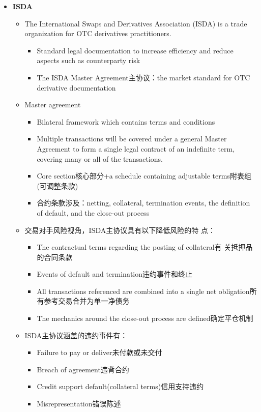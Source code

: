\begin{itemize}
\item \textbf{ISDA}
\begin{itemize}
    \item The International Swaps and Derivatives Association (ISDA) is a trade organization for OTC derivatives practitioners.
    \begin{itemize}
        \item Standard legal documentation to increase efficiency and reduce aspects such as counterparty risk
        \item The ISDA Master Agreement主协议：the market standard for OTC derivative documentation
    \end{itemize}
    \item Master agreement
    \begin{itemize}
    \item Bilateral framework which contains terms and conditions
    \item Multiple transactions will be covered under a general Master Agreement to form a single legal contract of an indefinite term, covering many or all of the transactions.
    \item Core section核心部分+a schedule containing adjustable terms附表组(可调整条款)
    \item 合约条款涉及：netting, collateral, termination events, the definition of default, and the close-out process
    \end{itemize}
\item 交易对手风险视角，ISDA主协议具有以下降低风险的特
点：
\begin{itemize}
\item The contractual terms regarding the posting of collateral有
关抵押品的合同条款
\item Events of default and termination违约事件和终止
\item All transactions referenced are combined into a single net obligation所有参考交易合并为单一净债务
\item The mechanics around the close-out process are defined确定平仓机制
\end{itemize}
\item ISDA主协议涵盖的违约事件有：
\begin{itemize}
\item Failure to pay or deliver未付款或未交付
\item Breach of agreement违背合约
\item Credit support default(collateral terms)信用支持违约
\item Misrepresentation错误陈述

\end{itemize}
\end{itemize}
\end{itemize}
